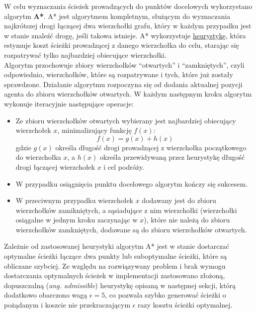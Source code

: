 \documentclass[a4paper, 12pt]{article}
\begin{document}
        W celu wyznaczania ścieżek prowadzących do punktów docelowych wykorzystano algorytm \textbf{A*}. A* jest algorytmem kompletnym, służącym do wyznaczania najkrótszej drogi łączącej dwa wierzchołki grafu, który w każdym przypadku jest w stanie znaleźć drogę, jeśli takowa istnieje. A* wykorzystuje \hyperref[sec:path-deviation]{heurystykę}, która estymuje koszt ścieżki prowadzącej z danego wierzchołka do celu, starając się rozpatrywać tylko najbardziej obiecujące wierzchołki. \\

\noindent
Algorytm przochowuje zbiory wierzchołków ``otwartych'' i ``zamkniętych'', czyli odpowiednio, wierzchołków, które są rozpatrywane i tych, które już zostały sprawdzone. Działanie algorytmu rozpoczyna się od dodania aktualnej pozycji agenta do zbioru wierzchołków otwartych. W każdym następnym kroku algorytm wykonuje iteracyjnie następujące operacje:

        \begin{itemize}
            \item Ze zbioru wierzchołków otwartych wybierany jest najbardziej obiecujący wierzchołek $x$, minimalizujący funkcję $f(x)$:
              \[ f(x) = g(x) + h(x) \]
              gdzie $g(x)$ określa długość drogi prowadzącej z wierzchołka początkowego do wierzchołka $x$, a $h(x)$ określa przewidywaną przez heurystykę długość drogi łączącej wierzchołek $x$ i cel podróży.
            \item W przypadku osiągnięcia punktu docelowego algorytm kończy się sukcesem.
            \item W przeciwnym przypadku wierzchołek $x$ dodawany jest do zbioru wierzchołków zamikniętych, a sąsiadujące z nim wierzchołki (wierzchołki osiągalne w jednym kroku zaczynając w $x$), które nie należą do zbioru wierzchołków zamkniętych, dodawane są do zbioru wierzchołków otwartych.
        \end{itemize}

\noindent
Zależnie od zastosowanej heurystyki algorytm A* jest w stanie dostarczać optymalne ścieżki łączące dwa punkty lub suboptymalne ścieżki, które są obliczane szybciej. Ze względu na rozwiązywany problem i brak wymogu dostarczania optymalnych ścieżek w implementacji zastosowano złożoną, dopuszczalną (\emph{ang. admissible}) heurystykę opisaną w następnej sekcji, którą dodatkowo obarczono wagą $\epsilon = 5$, co pozwala szybko generować ścieżki o pożądanym i koszcie nie przekraczającym $\epsilon$ razy kosztu ścieżki optymalnej.
\end{document}
